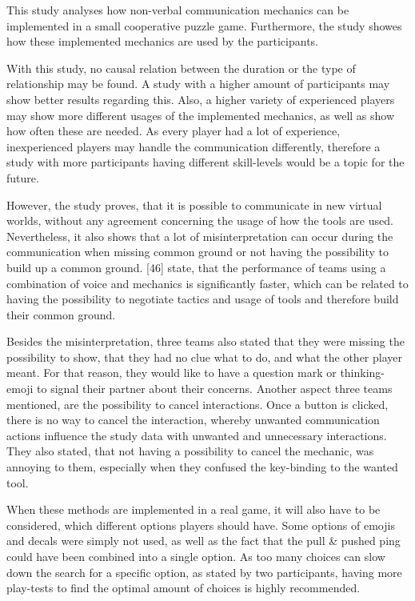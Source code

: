 This study analyses how non-verbal communication mechanics can be implemented in a small cooperative puzzle game. Furthermore, the study showes how these implemented mechanics are used by the participants.

With this study, no causal relation between the duration or the type of relationship may be found. 
A study with a higher amount of participants may show better results regarding this.
Also, a higher variety of experienced players may show more different usages of the implemented mechanics, as well as show how often these are needed. 
As every player had a lot of experience, inexperienced players may handle the communication differently, therefore a study with more participants having different skill-levels would be a topic for the future.

However, the study proves, that it is possible to communicate in new virtual worlds, without any agreement concerning the usage of how the tools are used. Nevertheless, it also shows that a lot of misinterpretation can occur during the communication when missing common ground or not having the possibility to build up a common ground.
\textcite{Vaddi2016Investigating2}[46] state, that the performance of teams using a combination of voice and mechanics is significantly faster, which can be related to having the possibility to negotiate tactics and usage of tools and therefore build their common ground.

Besides the misinterpretation, three teams also stated that they were missing the possibility to show, that they had no clue what to do, and what the other player meant. For that reason, they would like to have a question mark or thinking-emoji to signal their partner about their concerns.
Another aspect three teams mentioned, are the possibility to cancel interactions. Once a button is clicked, there is no way to cancel the interaction, whereby unwanted communication actions influence the study data with unwanted and unnecessary interactions. They also stated, that not having a possibility to cancel the mechanic, was annoying to them, especially when they confused the key-binding to the wanted tool.

When these methods are implemented in a real game, it will also have to be considered, which different options players should have. Some options of emojis and decals were simply not used, as well as the fact that the pull \& pushed ping could have been combined into a single option. As too many choices can slow down the search for a specific option, as stated by two participants, having more play-tests to find the optimal amount of choices is highly recommended.
